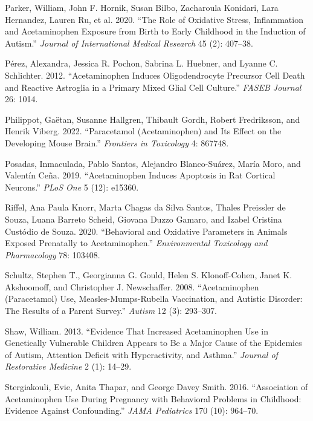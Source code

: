 \documentclass[12pt]{article}
\begin{document}
\begin{thebibliography}{99}
Parker, William, John F. Hornik, Susan Bilbo, Zacharoula Konidari, Lara Hernandez, Lauren Ru, et al. 2020. ``The Role of Oxidative Stress, Inflammation and Acetaminophen Exposure from Birth to Early Childhood in the Induction of Autism.'' \textit{Journal of International Medical Research} 45 (2): 407--38.

P\'{e}rez, Alexandra, Jessica R. Pochon, Sabrina L. Huebner, and Lyanne C. Schlichter. 2012. ``Acetaminophen Induces Oligodendrocyte Precursor Cell Death and Reactive Astroglia in a Primary Mixed Glial Cell Culture.'' \textit{FASEB Journal} 26: 1014.

Philippot, Gaëtan, Susanne Hallgren, Thibault Gordh, Robert Fredriksson, and Henrik Viberg. 2022. ``Paracetamol (Acetaminophen) and Its Effect on the Developing Mouse Brain.'' \textit{Frontiers in Toxicology} 4: 867748.

Posadas, Inmaculada, Pablo Santos, Alejandro Blanco-Suárez, María Moro, and Valentín Ceña. 2019. ``Acetaminophen Induces Apoptosis in Rat Cortical Neurons.'' \textit{PLoS One} 5 (12): e15360.

Riffel, Ana Paula Knorr, Marta Chagas da Silva Santos, Thales Preissler de Souza, Luana Barreto Scheid, Giovana Duzzo Gamaro, and Izabel Cristina Custódio de Souza. 2020. ``Behavioral and Oxidative Parameters in Animals Exposed Prenatally to Acetaminophen.'' \textit{Environmental Toxicology and Pharmacology} 78: 103408.

Schultz, Stephen T., Georgianna G. Gould, Helen S. Klonoff-Cohen, Janet K. Akshoomoff, and Christopher J. Newschaffer. 2008. ``Acetaminophen (Paracetamol) Use, Measles-Mumps-Rubella Vaccination, and Autistic Disorder: The Results of a Parent Survey.'' \textit{Autism} 12 (3): 293--307.

Shaw, William. 2013. ``Evidence That Increased Acetaminophen Use in Genetically Vulnerable Children Appears to Be a Major Cause of the Epidemics of Autism, Attention Deficit with Hyperactivity, and Asthma.'' \textit{Journal of Restorative Medicine} 2 (1): 14--29.

Stergiakouli, Evie, Anita Thapar, and George Davey Smith. 2016. ``Association of Acetaminophen Use During Pregnancy with Behavioral Problems in Childhood: Evidence Against Confounding.'' \textit{JAMA Pediatrics} 170 (10): 964--70.


\end{thebibliography}
\end{document}
